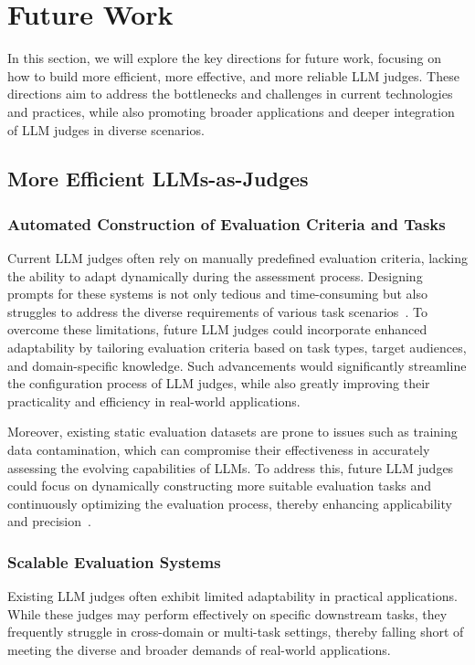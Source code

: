 \section{Future Work}
\label{sec:Future}
In this section, we will explore the key directions for future work, focusing on how to build more efficient, more effective, and more reliable LLM judges. These directions aim to address the bottlenecks and challenges in current technologies and practices, while also promoting broader applications and deeper integration of LLM judges in diverse scenarios.


\subsection{More Efficient LLMs-as-Judges}
\label{sec:more-Efficient}

\subsubsection{Automated Construction of Evaluation Criteria and Tasks}

Current LLM judges often rely on manually predefined evaluation criteria, lacking the ability to adapt dynamically during the assessment process. Designing prompts for these systems is not only tedious and time-consuming but also struggles to address the diverse requirements of various task scenarios~\cite{bai2024benchmarking,zhao2024auto,yu2024kieval,zhang2024talec,wang2024revisiting}. To overcome these limitations, future LLM judges could incorporate enhanced adaptability by tailoring evaluation criteria based on task types, target audiences, and domain-specific knowledge. Such advancements would significantly streamline the configuration process of LLM judges, while also greatly improving their practicality and efficiency in real-world applications.

Moreover, existing static evaluation datasets are prone to issues such as training data contamination, which can compromise their effectiveness in accurately assessing the evolving capabilities of LLMs. To address this, future LLM judges could focus on dynamically constructing more suitable evaluation tasks and continuously optimizing the evaluation process, thereby enhancing applicability and precision~\cite{bai2024benchmarking,zhao2024auto}.

\subsubsection{Scalable Evaluation Systems}
Existing LLM judges often exhibit limited adaptability in practical applications. While these judges may perform effectively on specific downstream tasks, they frequently struggle in cross-domain or multi-task settings, thereby falling short of meeting the diverse and broader demands of real-world applications.

